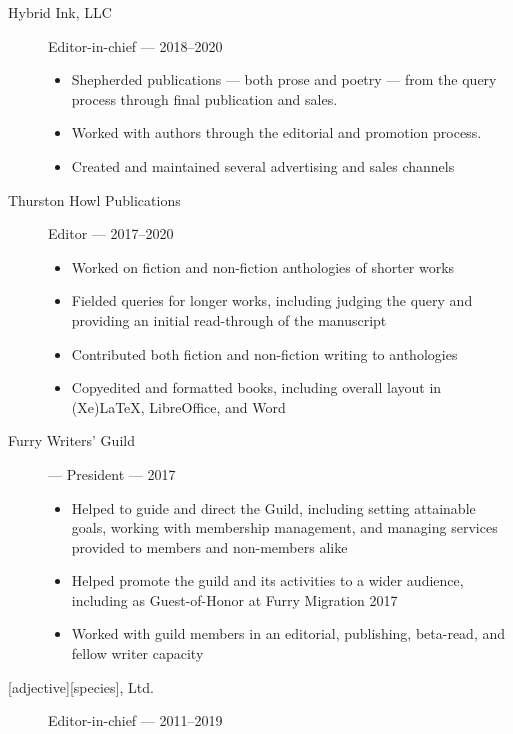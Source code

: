 \begin{description}
\item[Hybrid Ink, LLC]
Editor-in-chief --- 2018--2020

\begin{itemize}
\tightlist
\item
  Shepherded publications --- both prose and poetry --- from the query process through final publication and sales.
\item
  Worked with authors through the editorial and promotion process.
\item
  Created and maintained several advertising and sales channels
\end{itemize}
\item[Thurston Howl Publications]
Editor --- 2017--2020

\begin{itemize}
\tightlist
\item
  Worked on fiction and non-fiction anthologies of shorter works
\item
  Fielded queries for longer works, including judging the query and
  providing an initial read-through of the manuscript
\item
  Contributed both fiction and non-fiction writing to anthologies
\item
  Copyedited and formatted books, including overall layout in (Xe)LaTeX, LibreOffice, and Word
\end{itemize}
\item[Furry Writers' Guild] --- President --- 2017

\begin{itemize}
  \item Helped to guide and direct the Guild, including setting attainable goals, working with membership management, and managing services provided to members and non-members alike
  \item Helped promote the guild and its activities to a wider audience, including as Guest-of-Honor at Furry Migration 2017
  \item Worked with guild members in an editorial, publishing, beta-read, and fellow writer capacity
\end{itemize}
\item[{[}adjective{]}{[}species{]}, Ltd.]
Editor-in-chief --- 2011--2019


\end{description}

